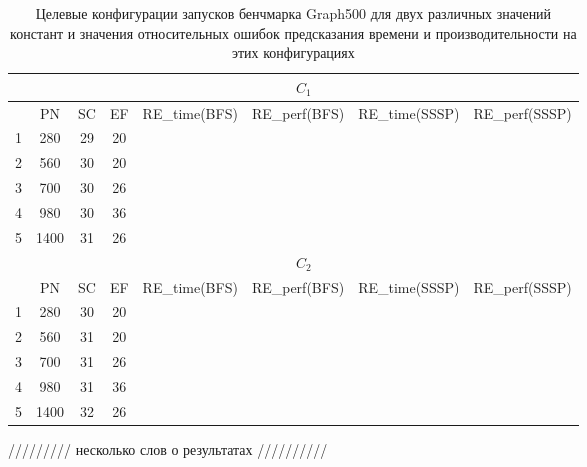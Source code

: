 		\begin{table}
			\centering
			\begin{tabular}{|r||c|c|c|c|c|c|c|}
				\hline
				            & \multicolumn{7}{c|}{\(C_1\)}                                                     \\ \hline
				\textnumero & PN   & SC & EF & RE\_time(BFS) & RE\_perf(BFS) & RE\_time(SSSP) & RE\_perf(SSSP) \\ \hline
				1           & 280  & 29 & 20 &               &               &                &                \\ \hline
				2           & 560  & 30 & 20 &               &               &                &                \\ \hline  
				3           & 700  & 30 & 26 &               &               &                &                \\ \hline
				4           & 980  & 30 & 36 &               &               &                &                \\ \hline
				5           & 1400 & 31 & 26 &               &               &                &                \\ \hhline{|=||=|=|=|=|=|=|=|}
				            & \multicolumn{7}{c|}{\(C_2\)}                                                     \\ \hline
				            & PN   & SC & EF & RE\_time(BFS) & RE\_perf(BFS) & RE\_time(SSSP) & RE\_perf(SSSP) \\ \hline
				1           & 280  & 30 & 20 &               &               &                &                \\ \hline
				2           & 560  & 31 & 20 &               &               &                &                \\ \hline
				3           & 700  & 31 & 26 &               &               &                &                \\ \hline
				4           & 980  & 31 & 36 &               &               &                &                \\ \hline
				5           & 1400 & 32 & 26 &               &               &                &                \\ \hline               
			\end{tabular}
			\caption{Целевые конфигурации запусков бенчмарка Graph500 для двух различных значений констант и значения относительных ошибок предсказания времени и производительности на этих конфигурациях}
			\label{targer_Graph500}
		\end{table}

		///////// несколько слов о результатах //////////
\clearpage
